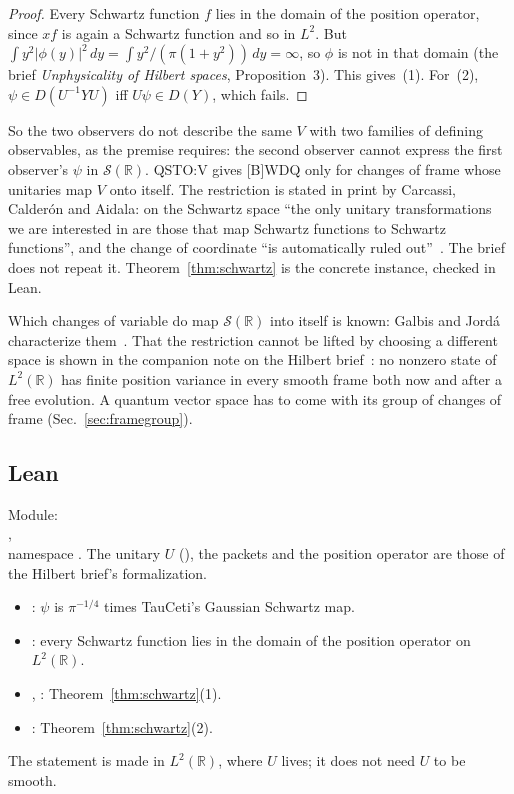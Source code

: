 \documentclass[11pt]{article}
\theoremstyle{definition}
\begin{document}
\begin{proof}
  Every Schwartz function $f$ lies in the domain of the position operator, since $xf$ is again
  a Schwartz function and so in $L^2$. But $\int y^2|\phi(y)|^2\,dy =
  \int y^2/(\pi(1+y^2))\,dy = \infty$, so $\phi$ is not in that domain (the brief
  \emph{Unphysicality of Hilbert spaces}, Proposition~3). This gives~(1). For~(2),
  $\psi \in D(U^{-1}YU)$ iff $U\psi \in D(Y)$, which fails.
\end{proof}

So the two observers do not describe the same $V$ with two families of defining observables, as
the premise requires: the second observer cannot express the first observer's $\psi$ in
$\mathcal S(\mathbb R)$. QSTO:V gives [B]WDQ only for changes of frame whose unitaries map $V$
onto itself. The restriction is stated in print by Carcassi, Calderón and Aidala: on the Schwartz
space ``the only unitary transformations we are interested in are those that map Schwartz
functions to Schwartz functions'', and the change of coordinate ``is automatically ruled
out''~\cite[Appendix, Sec.~VIII]{cca}. The brief does not repeat it. Theorem~\ref{thm:schwartz}
is the concrete instance, checked in Lean.

Which changes of variable do map $\mathcal S(\mathbb R)$ into itself is known: Galbis and Jordá
characterize them~\cite[Thm.~2.3]{galbis}. That the restriction cannot be lifted by choosing a
different space is shown in the companion note on the Hilbert brief~\cite[Sec.~2]{further-hilbert}:
no nonzero state of $L^2(\mathbb R)$ has finite position variance in every smooth frame both now
and after a free evolution. A quantum vector space has to come with its group of changes of frame
(Sec.~\ref{sec:framegroup}).

\subsection{Lean}

Module:\\ ,\\ namespace
. The unitary $U$ (), the packets
and the position operator are those of the Hilbert brief's formalization.
\begin{itemize}
  \item {}: $\psi$ is $\pi^{-1/4}$ times TauCeti's Gaussian Schwartz map.
  \item {}: every Schwartz function lies in the domain of the position
    operator on $L^2(\mathbb R)$.
  \item {}, :
    Theorem~\ref{thm:schwartz}(1).
  \item {}: Theorem~\ref{thm:schwartz}(2).
\end{itemize}
The statement is made in $L^2(\mathbb R)$, where $U$ lives; it does not need $U$ to be smooth.
\end{document}
